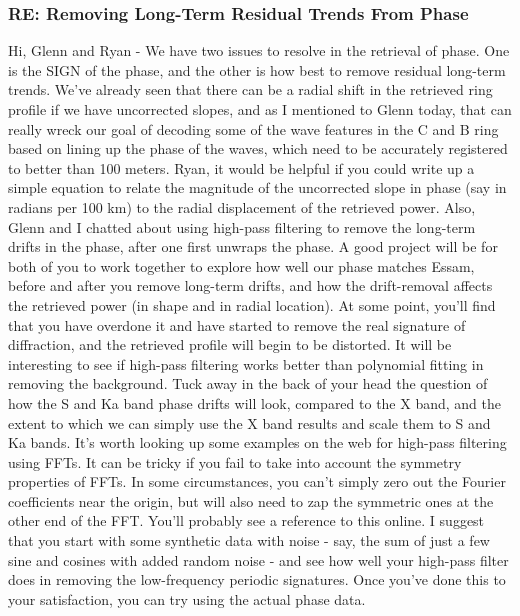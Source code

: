 \documentclass[crop=false,class=book]{standalone}
\begin{document}
\subsubsection{\footnotesize RE: Removing Long-Term Residual Trends From Phase}
Hi, Glenn and Ryan - We have two issues to resolve in the retrieval of phase. One is the SIGN of the phase, and the other is how best to remove residual long-term trends. We've already seen that there can be a radial shift in the retrieved ring profile if we have uncorrected slopes, and as I mentioned to Glenn today, that can really wreck our goal of decoding some of the wave features in the C and B ring based on lining up the phase of the waves, which need to be accurately registered to better than 100 meters. Ryan, it would be helpful if you could write up a simple equation to relate the magnitude of the uncorrected slope in phase (say in radians per 100 km) to the radial displacement of the retrieved power. Also, Glenn and I chatted about using high-pass filtering to remove the long-term drifts in the phase, after one first unwraps the phase. A good project will be for both of you to work together to explore how well our phase matches Essam, before and after you remove long-term drifts, and how the drift-removal affects the retrieved power (in shape and in radial location). At some point, you'll find that you have overdone it and have started to remove the real signature of diffraction, and the retrieved profile will begin to be distorted. It will be interesting to see if high-pass filtering works better than polynomial fitting in removing the background. Tuck away in the back of your head the question of how the S and Ka band phase drifts will look, compared to the X band, and the extent to which we can simply use the X band results and scale them to S and Ka bands. It's worth looking up some examples on the web for high-pass filtering using FFTs. It can be tricky if you fail to take into account the symmetry properties of FFTs. In some circumstances, you can't simply zero out the Fourier coefficients near the origin, but will also need to zap the symmetric ones at the other end of the FFT. You'll probably see a reference to this online. I suggest that you start with some synthetic data with noise - say, the sum of just a few sine and cosines with added random noise - and see how well your high-pass filter does in removing the low-frequency periodic signatures. Once you've done this to your satisfaction, you can try using the actual phase data.
\end{document}
